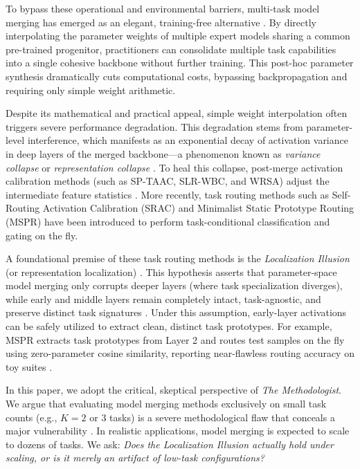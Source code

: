 \documentclass{article}
\theoremstyle{plain}
\theoremstyle{definition}
\theoremstyle{remark}
\begin{document}
To bypass these operational and environmental barriers, multi-task model merging has emerged as an elegant, training-free alternative \cite{sharma24, qu24, furina25}. By directly interpolating the parameter weights of multiple expert models sharing a common pre-trained progenitor, practitioners can consolidate multiple task capabilities into a single cohesive backbone without further training. This post-hoc parameter synthesis dramatically cuts computational costs, bypassing backpropagation and requiring only simple weight arithmetic.

Despite its mathematical and practical appeal, simple weight interpolation often triggers severe performance degradation. This degradation stems from parameter-level interference, which manifests as an exponential decay of activation variance in deep layers of the merged backbone---a phenomenon known as \emph{variance collapse} or \emph{representation collapse} \cite{He2024LocalizeandStitchEM, Sun2025TaskAI}. To heal this collapse, post-merge activation calibration methods (such as SP-TAAC, SLR-WBC, and WRSA) adjust the intermediate feature statistics \cite{Lv2025DeepMD, Saadati2024DIMATDI, Yılmaz2025AdvancedAM}. More recently, task routing methods such as Self-Routing Activation Calibration (SRAC) \cite{selfrouting26} and Minimalist Static Prototype Routing (MSPR) \cite{furina25} have been introduced to perform task-conditional classification and gating on the fly.

A foundational premise of these task routing methods is the \emph{Localization Illusion} (or representation localization) \cite{Wang2024LocalizingTI, He2024LocalizeandStitchEM, Lv2025ThePO}. This hypothesis asserts that parameter-space model merging only corrupts deeper layers (where task specialization diverges), while early and middle layers remain completely intact, task-agnostic, and preserve distinct task signatures \cite{Lv2025ThePO}. Under this assumption, early-layer activations can be safely utilized to extract clean, distinct task prototypes. For example, MSPR extracts task prototypes from Layer 2 and routes test samples on the fly using zero-parameter cosine similarity, reporting near-flawless routing accuracy on toy suites \cite{furina25}.

In this paper, we adopt the critical, skeptical perspective of \emph{The Methodologist}. We argue that evaluating model merging methods exclusively on small task counts (e.g., $K=2$ or $3$ tasks) is a severe methodological flaw that conceals a major vulnerability \cite{Khan2024SoKOF, Zhang2025ControlBF, Xia2026ReplicabilityOU}. In realistic applications, model merging is expected to scale to dozens of tasks. We ask: \emph{Does the Localization Illusion actually hold under scaling, or is it merely an artifact of low-task configurations?}
\end{document}
